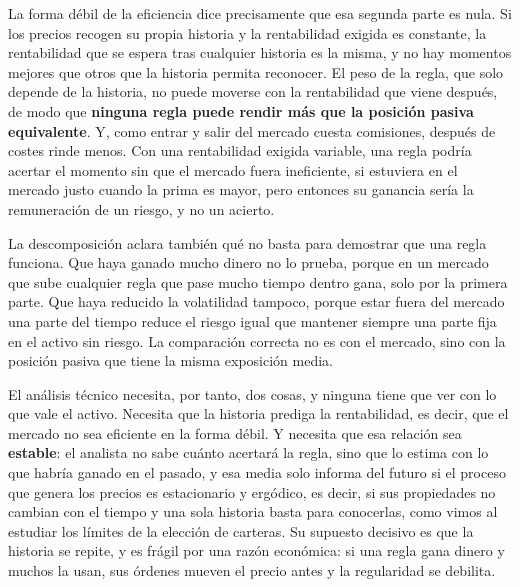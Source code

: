 \documentclass[10pt,a4paper]{article}
\begin{document}
La forma débil de la eficiencia dice precisamente que esa segunda parte es nula. Si los precios recogen su propia historia y la rentabilidad exigida es constante, la rentabilidad que se espera tras cualquier historia es la misma, y no hay momentos mejores que otros que la historia permita reconocer. El peso de la regla, que solo depende de la historia, no puede moverse con la rentabilidad que viene después, de modo que \textbf{ninguna regla puede rendir más que la posición pasiva equivalente}. Y, como entrar y salir del mercado cuesta comisiones, después de costes rinde menos. Con una rentabilidad exigida variable, una regla podría acertar el momento sin que el mercado fuera ineficiente, si estuviera en el mercado justo cuando la prima es mayor, pero entonces su ganancia sería la remuneración de un riesgo, y no un acierto.

La descomposición aclara también qué no basta para demostrar que una regla funciona. Que haya ganado mucho dinero no lo prueba, porque en un mercado que sube cualquier regla que pase mucho tiempo dentro gana, solo por la primera parte. Que haya reducido la volatilidad tampoco, porque estar fuera del mercado una parte del tiempo reduce el riesgo igual que mantener siempre una parte fija en el activo sin riesgo. La comparación correcta no es con el mercado, sino con la posición pasiva que tiene la misma exposición media.

El análisis técnico necesita, por tanto, dos cosas, y ninguna tiene que ver con lo que vale el activo. Necesita que la historia prediga la rentabilidad, es decir, que el mercado no sea eficiente en la forma débil. Y necesita que esa relación sea \textbf{estable}: el analista no sabe cuánto acertará la regla, sino que lo estima con lo que habría ganado en el pasado, y esa media solo informa del futuro si el proceso que genera los precios es estacionario y ergódico, es decir, si sus propiedades no cambian con el tiempo y una sola historia basta para conocerlas, como vimos al estudiar los límites de la elección de carteras. Su supuesto decisivo es que la historia se repite, y es frágil por una razón económica: si una regla gana dinero y muchos la usan, sus órdenes mueven el precio antes y la regularidad se debilita.
\end{document}
